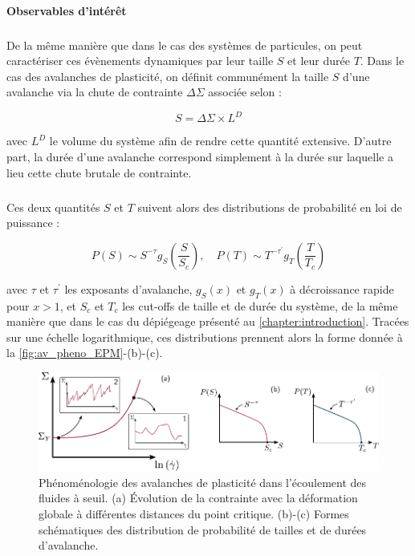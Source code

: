 \paragraph{Observables d'intérêt}

\subparagraph{}De la même manière que dans le cas des systèmes de particules, on peut caractériser ces évènements dynamiques par leur taille $S$ et leur durée $T$. Dans le cas des avalanches de plasticité, on définit communément la taille $S$ d'une avalanche via la chute de contrainte $\Delta\Sigma$ associée selon :

\begin{equation}
	S = \Delta\Sigma\times L^D
\end{equation}

\noindent avec $L^D$ le volume du système afin de rendre cette quantité extensive. D'autre part, la durée d'une avalanche correspond simplement à la durée sur laquelle a lieu cette chute brutale de contrainte.

\subparagraph{}Ces deux quantités $S$ et $T$ suivent alors des distributions de probabilité en loi de puissance :

\begin{equation}
	P(S) \sim S^{-\tau}g_S\left( \frac{S}{S_c} \right), \quad P(T) \sim T^{-\tau^\prime}g_T\left( \frac{T}{T_c} \right)
	\label{eq:AvalancheDistrib}
\end{equation}

\noindent avec $\tau$ et $\tau^\prime$ les exposants d'avalanche, $g_S(x)$ et $g_T(x)$ à décroissance rapide pour $x>1$, et $S_c$ et $T_c$ les cut-offs de taille et de durée du système, de la même manière que dans le cas du dépiégeage présenté au \autoref{chapter:introduction}. Tracées sur une échelle logarithmique, ces distributions prennent alors la forme donnée à la \autoref{fig:av_pheno_EPM}-(b)-(c).

\begin{figure}[h]
	\centering
	\includegraphics[width=\textwidth]{Chapitre4/Figures/Avalanches/Pheno.pdf}
	\caption{Phénoménologie des avalanches de plasticité dans l'écoulement des fluides à seuil. (a) Évolution de la contrainte avec la déformation globale à différentes distances du point critique. (b)-(c) Formes schématiques des distribution de probabilité de tailles et de durées d'avalanche.}
	\label{fig:av_pheno_EPM}
\end{figure}

